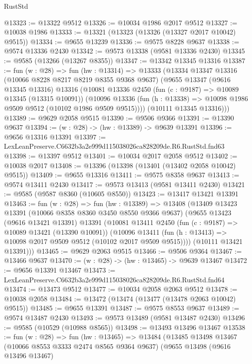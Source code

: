 \begin{lexlean}{RustStd}
\begin{coremodule}
@13323 := @13322 @9512
@13326 := @10034 @1986 @2017 @9512
@13327 := @10038 @1986
@13333 := @13321 (@13323 (@13326 (@13327 @2017 @10042) @9515))
@13334 := @9655 @13239
@13336 := @9575 @8228 @9637
@13338 := @9574 @13336 @2430
@13342 := @9573 @13338 (@9581 @13336 @2430)
@13345 := @9585 (@13266 (@13267 @8355))
@13347 := @13342 @13345 @13316
@13387 := fun (w : @28) =>
  fun (hw : @13314) =>
  @13333
    (@13334
      @13347
      @13316
      (@10066 @8228 @8217 @8219 @8355 @9368 @9637)
      (@9655
        @13347
        (@9616 @13345 @13316)
        @13316
        (@10081
          @13336
          @2450
          (fun (c : @9187) => @10089 @13345 (@13315 @10091))
          (@10096 @13336 (fun (h : @13338) => @10098 @1986 @9509 @9512 (@10102 @1986 @9509 @9515))))
        (@10111 @13345 @13316)))
@13389 := @9629 @2058 @9515
@13390 := @9506 @9366
@13391 := @13390 @9637
@13394 := (w : @28) -> (hw : @13389) -> @9639 @13391
@13396 := @9656 @13316 @13391
@13397 := LexLeanPreserve.C6632b3a2e999d115038026ca828209de.R6.RustStd.fnd63
@13398 := @13397 @9512
@13401 := @10034 @2017 @2058 @9512
@13402 := @10038 @2017
@13408 := @13396 (@13398 (@13401 (@13402 @2058 @10042) @9515))
@13409 := @9655 @13316
@13411 := @9575 @8358 @9637
@13413 := @9574 @13411 @2430
@13417 := @9573 @13413 (@9581 @13411 @2430)
@13421 := @9585 (@9587 @8360 (@10605 @8550))
@13423 := @13417 @13421 @13391
@13463 := fun (w : @28) =>
  fun (hw : @13389) =>
  @13408
    (@13409
      @13423
      @13391
      (@10066 @8358 @8360 @3450 @8550 @9366 @9637)
      (@9655
        @13423
        (@9616 @13421 @13391)
        @13391
        (@10081
          @13411
          @2450
          (fun (c : @9187) => @10089 @13421 (@13390 @10091))
          (@10096 @13411 (fun (h : @13413) => @10098 @2017 @9509 @9512 (@10102 @2017 @9509 @9515))))
        (@10111 @13421 @13391)))
@13465 := @9629 @2063 @9515
@13466 := @9506 @9364
@13467 := @13466 @9637
@13470 := (w : @28) -> (hw : @13465) -> @9639 @13467
@13472 := @9656 @13391 @13467
@13473 := LexLeanPreserve.C6632b3a2e999d115038026ca828209de.R6.RustStd.fnd64
@13474 := @13473 @9512
@13477 := @10034 @2058 @2063 @9512
@13478 := @10038 @2058
@13484 := @13472 (@13474 (@13477 (@13478 @2063 @10042) @9515))
@13485 := @9655 @13391
@13487 := @9575 @8553 @9637
@13489 := @9574 @13487 @2430
@13493 := @9573 @13489 (@9581 @13487 @2430)
@13496 := @9585 (@10529 (@10988 @8565))
@13498 := @13493 @13496 @13467
@13538 := fun (w : @28) =>
  fun (hw : @13465) =>
  @13484
    (@13485
      @13498
      @13467
      (@10066 @8553 @3333 @2474 @8565 @9364 @9637)
      (@9655
        @13498
        (@9616 @13496 @13467)

\end{coremodule}
\end{lexlean}
